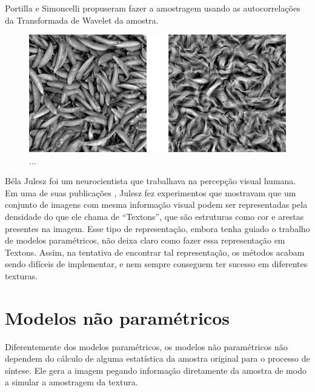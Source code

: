 
Portilla e Simoncelli \cite{Portilla1999}
propuseram fazer a amostragem usando
as autocorrelações da Transformada
de Wavelet da amostra.

\begin{figure}[!ht]
	\centering
	\includegraphics[width=\linewidth*2/3]{files/assets/articles/portilla.png}
	\caption{...}
	\label{img:preview}
\end{figure}




Béla Julesz foi um neurocientista que
trabalhava na percepção visual humana.
Em uma de suas publicações \cite{Julesz1981},
Julesz fez experimentos que mostravam
que um conjunto de imagens com mesma
informação visual podem ser representadas
pela densidade do que ele chama de
``Textons'', que são estruturas
como cor e arestas presentes na imagem.
Esse tipo de representação, embora tenha
guiado o trabalho de modelos paramétricos,
não deixa claro como fazer essa representação
em Textons. Assim, na tentativa de encontrar
tal representação, os métodos acabam sendo
difíceis de implementar, e nem sempre
conseguem ter sucesso em diferentes texturas.





\section{Modelos não paramétricos}


Diferentemente dos modelos paramétricos,
os modelos não paramétricos não dependem
do cálculo de alguma
estatística da amostra original para
o processo de síntese. Ele gera a imagem
pegando informação diretamente da
amostra de modo a simular a amostragem
da textura.

